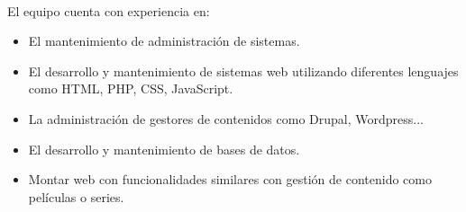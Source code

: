
\paragraph{} El equipo cuenta con experiencia en:
\begin{itemize}

\item El mantenimiento de administración de sistemas.
\item El desarrollo y mantenimiento de sistemas web utilizando diferentes lenguajes como HTML, PHP, CSS, JavaScript.
\item La administración de gestores de contenidos como Drupal, Wordpress... 
\item El desarrollo y mantenimiento de bases de datos.
\item Montar web con funcionalidades similares con gestión de contenido como películas o series.

\end{itemize}